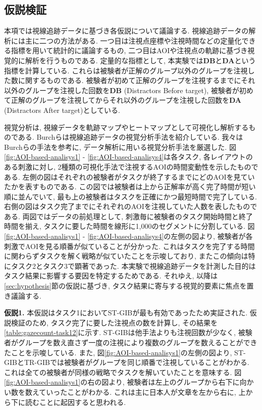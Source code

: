 \documentclass{kuee}
\begin{document}
\subsection{仮説検証}
\label{subsec:eyetrack_result_ex1}
本項では視線追跡データに基づき各仮説について議論する.
視線追跡データの解析には主に二つの方法がある.
一つ目は注視点座標や注視時間などの定量化できる指標を用いて統計的に議論するもの, 二つ目はAOIや注視点の軌跡に基づき視覚的に解析を行うものである.
定量的な指標として, 本実験では{\bf DB}と{\bf DA}という指標を計算している.
これらは被験者が正解のグループ以外のグループを注視した数に関するものである.
被験者が初めて正解のグループを注視するまでにそれ以外のグループを注視した回数を{\bf DB} (Distractors Before target), 被験者が初めて正解のグループを注視してからそれ以外のグループを注視した回数を{\bf DA} (Distractors After target)としている.

視覚分析は, 視線データを軌跡マップやヒートマップとして可視化し解析するものである.
Burchらは視線追跡データの視覚分析手法を紹介している\cite{Burch2013VisualTS}.
我々はBurchらの手法を参考に, データ解析に用いる視覚分析手法を厳選した.
図\ref{fig:AOI-based-analisys1} - \ref{fig:AOI-based-analisys4}は各タスク, 各レイアウトのある刺激に対し, 2種類の可視化手法で注視するAOIの時間変動性を示したものである.
左側の図はそれぞれの被験者がタスクが終了するまでにどのAOIを見ていたかを表すものである.
この図では被験者は上から正解率が高く完了時間が短い順に並んでいて, 最も上の被験者はタスクを正確にかつ最短時間で完了している.
右側の図はタスク完了までにそれぞれのAOIを注視していた人数を表したものである.
両図ではデータの前処理として, 刺激毎に被験者のタスク開始時間と終了時間を揃え, タスクに要した時間を線形に1,000のセグメントに分割している.
図\ref{fig:AOI-based-analisys1} - \ref{fig:AOI-based-analisys4}の左側の図より, 被験者が各刺激でAOIを見る順番が似ていることが分かった.
これはタスクを完了する時間に関わらずタスクを解く戦略が似ていたことを示唆しており, またこの傾向は特にタスク2とタスク3で顕著であった.
本実験で視線追跡データを計測した目的はタスク結果に影響する要因を特定するためである.
それゆえ, 以降は\ref{sec:hypothesis}節の仮説に基づき, タスク結果に寄与する視覚的要素に焦点を置き議論する.

{\bf 仮説1.} 本仮説はタスク1においてST-GIBが最も有効であったため実証された.
仮説検証のため, タスク完了に要した注視点の数を計算し, その結果を\ref{table:gazecount-task12}に示す.
ST-GIBは他手法よりも注視回数が少なく, 被験者がグループを数え直さず一度の注視により複数のグループを数えることができたことを示唆している.
また, 図\ref{fig:AOI-based-analisys1}の左側の図より, ST-GIBとTR-GIBでは被験者がグループを同じ順番で注視していることがわかる.
これは全ての被験者が同様の戦略でタスクを解いていたことを意味する.
図\ref{fig:AOI-based-analisys1}の右の図より, 被験者は左上のグループから右下に向かい数を数えていったことがわかる.
これは主に日本人が文章を左から右に, 上から下に読むことに起因すると思われる.
\end{document}
